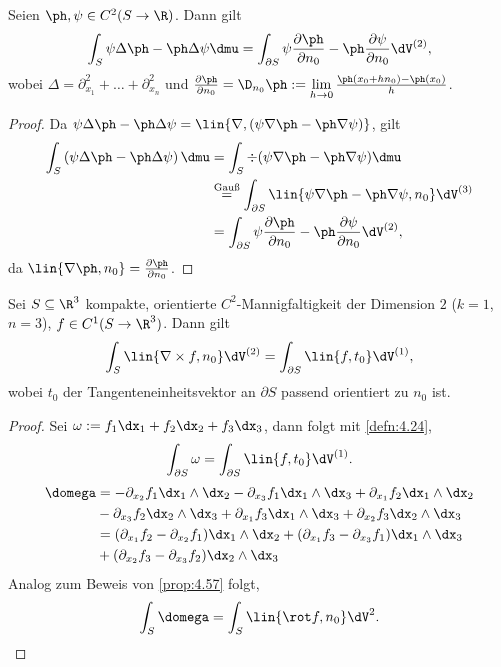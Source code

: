 \begin{prop}
\label{prop:4.59}
Seien $\ph,\psi\in C^2(S\to\R)$. Dann gilt
\begin{align*}
\int_S \psi\Delta \ph - \ph\Delta \psi \dmu = \int_{\partial S}
\psi\frac{\partial \ph}{\partial n_0} - \ph\frac{\partial\psi}{\partial n_0}
\dV^{(2)},
\end{align*}
wobei $\Delta = \partial_{x_1}^2+\ldots+\partial_{x_n}^2$ und
$\frac{\partial\ph}{\partial n_0} = \D_{n_0}\ph :=\lim\limits_{h\to0}
\frac{\ph(x_0+hn_0)-\ph(x_0)}{h}$.\fishhere
\end{prop}
\begin{proof} Da
$\psi\Delta\ph - \ph\Delta\psi = \lin{\nabla,(\psi\nabla\ph - \ph\nabla\psi)}$,
gilt
\begin{align*}
\int_S \left(\psi\Delta\ph - \ph\Delta\psi\right)\dmu
&= \int_S \div (\psi\nabla\ph - \ph\nabla\psi)\dmu\\
&\overset{\text{Gauß}}{=} \int_{\partial S} \lin{\psi\nabla\ph - \ph\nabla\psi,
n_0}\dV^{(3)}\\
&= \int_{\partial S}
\psi\frac{\partial \ph}{\partial n_0} - \ph\frac{\partial\psi}{\partial n_0}
\dV^{(2)},
\end{align*}
da $\lin{\nabla\ph,n_0} = \frac{\partial\ph}{\partial n_0}$.\qedhere
\end{proof}

\begin{prop}
\label{prop:4.60}
Sei $S\subseteq\R^3$ kompakte, orientierte $C^2$-Mannigfaltigkeit der Dimension
$2$ ($k=1$, $n=3$), $f\in C^1(S\to\R^3)$. Dann gilt
\begin{align*}
\int_S \lin{\nabla\times f,n_0} \dV^{(2)}
= \int_{\partial S} \lin{f,t_0} \dV^{(1)},
\end{align*}
wobei $t_0$ der Tangenteneinheitsvektor an $\partial S$ passend orientiert zu
$n_0$ ist.
\end{prop}
\begin{proof}
Sei $\omega := f_1\dx_1 + f_2\dx_2+ f_3\dx_3$, dann folgt mit \ref{defn:4.24},
\begin{align*}
\int_{\partial S} \omega = \int_{\partial S} \lin{f,t_0} \dV^{(1)}.
\end{align*}
\begin{align*}
\domega &= -\partial_{x_2} f_1 \dx_1\land\dx_2 -\partial_{x_3} f_1
\dx_1\land\dx_3 + \partial_{x_1} f_2 \dx_1\land\dx_2 \\ &- \partial_{x_3} f_2
\dx_2\land\dx_3 + \partial_{x_1} f_3 \dx_1\land\dx_3 + \partial_{x_2} f_3
\dx_2\land\dx_3\\
&= (\partial_{x_1} f_2-\partial_{x_2} f_1) \dx_1\land\dx_2 
 + (\partial_{x_1} f_3-\partial_{x_3} f_1) \dx_1\land\dx_3 \\
&+ (\partial_{x_2} f_3- \partial_{x_3} f_2) \dx_2\land\dx_3
\end{align*}
Analog zum Beweis von \ref{prop:4.57} folgt,
\begin{align*}
\int_{S} \domega = \int_S \lin{\rot f,n_0} \dV^{2}.\qedhere
\end{align*}
\end{proof}

